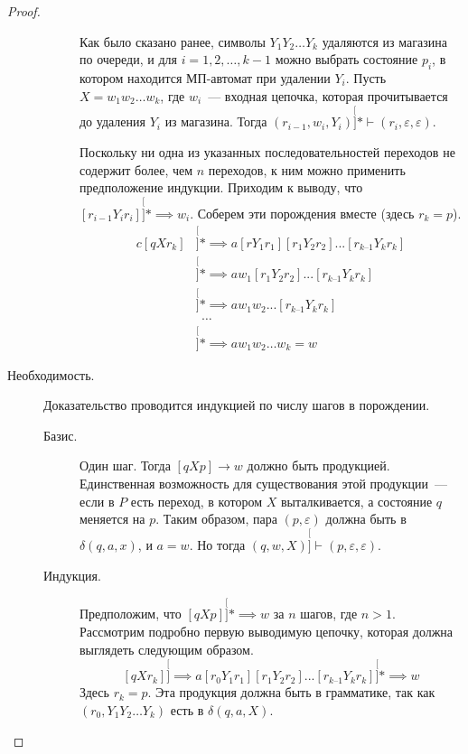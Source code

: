 \documentclass[a4paper,12pt]{article}
\begin{document}
\begin{proof}
\begin{description}
\begin{description}
			Как было сказано ранее, символы $Y_1 Y_2 \ldots Y_k$ удаляются из магазина по очереди, и для $i = 1, 2, \ldots, k - 1$ можно выбрать состояние $p_i$, в котором находится МП-автомат при удалении $Y_i$. Пусть $X = w_1 w_2 \ldots w_k$, где $w_i$~--- входная цепочка, которая прочитывается до удаления $Y_i$ из магазина. Тогда $(r_{i - 1}, w_{i}, Y_{i}) \stackrel[]{*}{\vdash} (r_i, \varepsilon, \varepsilon)$. 
			
			Поскольку ни одна из указанных последовательностей переходов не содержит более, чем $n$ переходов, к ним можно применить предположение индукции. Приходим к выводу, что $[r_{i - 1} Y_i r_{i}] \stackrel[]{*}{\implies} w_i$. Соберем эти порождения вместе (здесь $r_k = p$).
			\[\begin{aligned}{c}
				[q X r_k] &{} \stackrel[]{*}{\implies}  a[r Y_1 r_1][r_1 Y_2 r_2]...[r_{k–1} Y_k r_k] \\
				&{} \stackrel[]{*}{\implies}  a w_1 [r_1 Y_2 r_2]...[r_{k–1} Y_k r_k] \\
				&{} \stackrel[]{*}{\implies}  a w_1 w_2 ...[r_{k–1} Y_k r_k] \\
				&{}\ \ \dots \\
				&{} \stackrel[]{*}{\implies}  a w_1 w_2 \ldots w_k = w 
			\end{aligned}\]
		\end{description}
		
		\item[Необходимость.] Доказательство проводится индукцией по числу шагов в порождении.
		\begin{description}
			\item[Базис.] Один шаг. Тогда $[qXp] \to w$ должно быть продукцией. Единственная возможность для существования этой продукции~--- если в $P$ есть переход, в котором $X$ выталкивается, а состояние $q$ меняется на $p$. Таким образом, пара $(p, \varepsilon)$ должна быть в $\delta(q, a, x)$, и $a = w$. Но тогда $(q, w, X) \stackrel[]{}{\vdash} (p, \varepsilon, \varepsilon)$.
			
			\item[Индукция.] Предположим, что $[qXp] \stackrel[]{*}{\implies} w$ за $n$ шагов, где $n > 1$. Рассмотрим подробно первую выводимую цепочку, которая должна выглядеть следующим образом.
			\[[q X r_k] \stackrel[]{}{\implies}  a[r_0 Y_1 r_1][r_1 Y_2 r_2]...[r_{k–1} Y_k r_k] \stackrel[]{*}{\implies} w \]
			Здесь $r_k = p$. Эта продукция должна быть в грамматике, так как $(r_0, Y_1 Y_2 \ldots Y_k)$ есть в $\delta(q, a, X)$. 
			

\end{description}
\end{description}
\end{proof}
\end{document}
